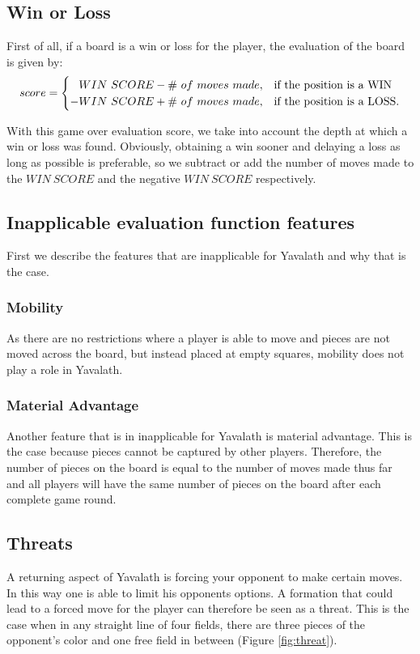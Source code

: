 \documentclass[11pt]{article}
\begin{document}
\subsection{Win or Loss}
\label{-subsec:winorloss}
First of all, if a board is a win or loss for the player, the evaluation of the board is given by:
\begin{equation}\label{eq:winscore}
score = \twopartdef{\phantom{-}WIN\ SCORE - \#\ of\ moves\ made}{\mbox{the position is a WIN}}{-WIN\ SCORE + \#\ of\ moves\ made}{\mbox{the position is a LOSS.}}
\end{equation}

With this game over evaluation score, we take into account the depth at which a win or loss was found. Obviously, obtaining a win sooner and delaying a loss as long as possible is preferable, so we subtract or add the number of moves made to the $WIN\ SCORE$ and the negative $WIN\ SCORE$ respectively.

\subsection{Inapplicable evaluation function features}
\label{-subsec:inapplicableevaluationfunctionfeatures}
First we describe the features that are inapplicable for Yavalath and why that is the case.

\subsubsection{Mobility}
\label{-subsubsec:mobility}
As there are no restrictions where a player is able to move and pieces are not moved across the board, but instead placed at empty squares, mobility does not play a role in Yavalath.

\subsubsection{Material Advantage}
\label{-subsubsec:materialadvantage}
Another feature that is in inapplicable for Yavalath is material advantage. This is the case because pieces cannot be captured by other players. Therefore, the number of pieces on the board is equal to the number of moves made thus far and all players will have the same number of pieces on the board after each complete game round.

\subsection{Threats}
\label{-subsec:threats}
A returning aspect of Yavalath is forcing your opponent to make certain moves. In this way one is able to limit his opponents options. A formation that could lead to a forced move for the player can therefore be seen as a threat. This is the case when in any straight line of four fields, there are three pieces of the opponent's color and one free field in between (Figure \ref{fig:threat}).
\end{document}
